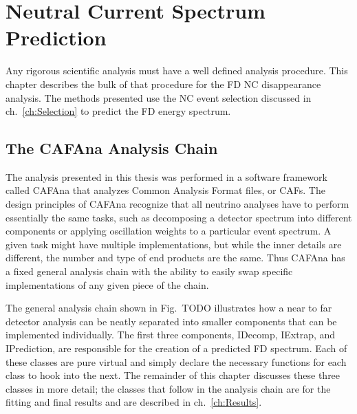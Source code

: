 \chapter{Neutral Current Spectrum Prediction}
\label{ch:Prediction}

Any rigorous scientific analysis must have a well defined analysis procedure. This chapter describes the bulk of that procedure for the FD NC disappearance analysis. The methods presented use the NC event selection discussed in ch.~\ref{ch:Selection} to predict the FD energy spectrum.

\section{The CAFAna Analysis Chain}

The analysis presented in this thesis was performed in a software framework called CAFAna that analyzes Common Analysis Format files, or CAFs. The design principles of CAFAna recognize that all neutrino analyses have to perform essentially the same tasks, such as decomposing a detector spectrum into different components or applying oscillation weights to a particular event spectrum. A given task might have multiple implementations, but while the inner details are different, the number and type of end products are the same. Thus CAFAna has a fixed general analysis chain with the ability to easily swap specific implementations of any given piece of the chain.

The general analysis chain shown in Fig.~TODO illustrates how a near to far detector analysis can be neatly separated into smaller components that can be implemented individually. The first three components, IDecomp, IExtrap, and IPrediction, are responsible for the creation of a predicted FD spectrum. Each of these classes are pure virtual and simply declare the necessary functions for each class to hook into the next. The remainder of this chapter discusses these three classes in more detail; the classes that follow in the analysis chain are for the fitting and final results and are described in ch.~\ref{ch:Results}.

